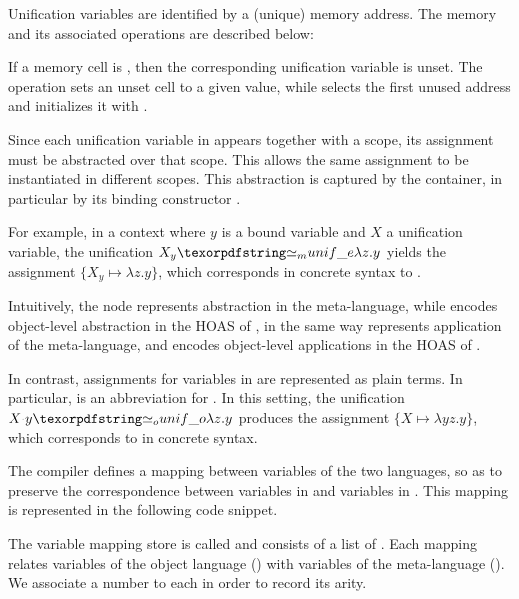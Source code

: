% 

Unification variables are identified by a (unique) memory address.
The memory and its associated operations are described below:



\noindent
If a memory cell is , then the corresponding unification
variable is unset. The operation  sets an unset cell to a
given value, while  selects the first unused address and
initializes it with .

Since each unification variable in \Ho appears together with a scope,
its assignment must be abstracted over that scope. This allows the same
assignment to be instantiated in different scopes. This abstraction is
captured by the  container, in particular by its binding
constructor .



For example, in a context where $y$ is a bound variable and $X$ a
unification variable, the unification $X_y \Ue \lambda z. y$ yields
the assignment $\{X_y \mapsto \lambda z. y \}$, which corresponds in \elpi
concrete syntax to .

Intuitively, the  node represents abstraction in the
meta-language, while \mlam encodes object-level abstraction in the HOAS
of \Ho, in the same way \muva represents application of
the meta-language, and \mapp encodes object-level applications in the HOAS
of \Ho.

In contrast, assignments for variables in \Fo are represented as plain
terms. In particular,  is an abbreviation for
. In this setting, the unification
$X \appsep y \Uo \lambda z. y$ produces the assignment
$\{X \mapsto \lambda y z. y\}$, which corresponds to  in
\elpi concrete syntax.


%
The compiler defines a mapping between variables of the two languages,
so as to preserve the correspondence between variables in \Fo and
variables in \Ho. This mapping is represented in the following code
snippet.



\noindent
The variable mapping store is called  and consists of a list
of . Each mapping relates variables of the object language
() with variables of the meta-language
(). We associate a number to each  in order
to record its arity.

